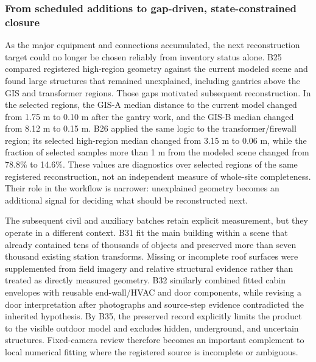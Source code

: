\documentclass[10pt,a4paper]{article}
\begin{document}
\hypertarget{from-scheduled-additions-to-gap-driven-state-constrained-closure}{%
\subsubsection{From scheduled additions to gap-driven, state-constrained
closure}\label{from-scheduled-additions-to-gap-driven-state-constrained-closure}}

As the major equipment and connections accumulated, the next
reconstruction target could no longer be chosen reliably from inventory
status alone. B25 compared registered high-region geometry against the
current modeled scene and found large structures that remained
unexplained, including gantries above the GIS and transformer regions.
Those gaps motivated subsequent reconstruction. In the selected regions,
the GIS-A median distance to the current model changed from 1.75 m to
0.10 m after the gantry work, and the GIS-B median changed from 8.12 m
to 0.15 m. B26 applied the same logic to the transformer/firewall
region; its selected high-region median changed from 3.15 m to 0.06 m,
while the fraction of selected samples more than 1 m from the modeled
scene changed from 78.8\% to 14.6\%. These values are diagnostics over
selected regions of the same registered reconstruction, not an
independent measure of whole-site completeness. Their role in the
workflow is narrower: unexplained geometry becomes an additional signal
for deciding what should be reconstructed next.

The subsequent civil and auxiliary batches retain explicit measurement,
but they operate in a different context. B31 fit the main building
within a scene that already contained tens of thousands of objects and
preserved more than seven thousand existing station transforms. Missing
or incomplete roof surfaces were supplemented from field imagery and
relative structural evidence rather than treated as directly measured
geometry. B32 similarly combined fitted cabin envelopes with reusable
end-wall/HVAC and door components, while revising a door interpretation
after photographs and source-step evidence contradicted the inherited
hypothesis. By B35, the preserved record explicitly limits the product
to the visible outdoor model and excludes hidden, underground, and
uncertain structures. Fixed-camera review therefore becomes an important
complement to local numerical fitting where the registered source is
incomplete or ambiguous.
\end{document}
